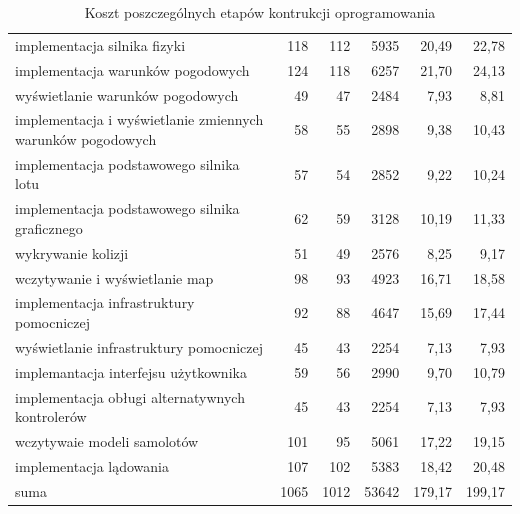 \documentclass{mwrep}
\begin{document}
\begin{table}
\begin{center}
\begin{tabular}{|p{7cm}|r|r|r|r|r|}
            implementacja silnika fizyki                                        & 118     & 112     & 5935     & 20,49   & 22,78 \\
            implementacja warunków pogodowych                                   & 124     & 118     & 6257     & 21,70   & 24,13 \\
            wyświetlanie warunków pogodowych                                    & 49      & 47      & 2484     & 7,93    & 8,81  \\
            implementacja i wyświetlanie zmiennych warunków pogodowych          & 58      & 55      & 2898     & 9,38    & 10,43 \\
            implementacja podstawowego silnika lotu                             & 57      & 54      & 2852     & 9,22    & 10,24 \\
            implementacja podstawowego silnika graficznego                      & 62      & 59      & 3128     & 10,19   & 11,33 \\
            wykrywanie kolizji                                                  & 51      & 49      & 2576     & 8,25    & 9,17  \\
            wczytywanie i wyświetlanie map                                      & 98      & 93      & 4923     & 16,71   & 18,58 \\
            implementacja infrastruktury pomocniczej                            & 92      & 88      & 4647     & 15,69   & 17,44 \\
            wyświetlanie infrastruktury pomocniczej                             & 45      & 43      & 2254     & 7,13    & 7,93  \\
            implemantacja interfejsu użytkownika                                & 59      & 56      & 2990     & 9,70    & 10,79 \\
            implementacja obługi alternatywnych kontrolerów                     & 45      & 43      & 2254     & 7,13    & 7,93  \\
            wczytywaie modeli samolotów                                         & 101     & 95      & 5061     & 17,22   & 19,15 \\
            implementacja lądowania                                             & 107     & 102     & 5383     & 18,42   & 20,48 \\
            \hline
            \hfill suma                                                         & 1065    & 1012    & 53642    & 179,17  & 199,17\\ \hline
        \end{tabular}
    \end{center}
    \caption{Koszt poszczególnych etapów kontrukcji oprogramowania}
\end{table}
\end{document}
